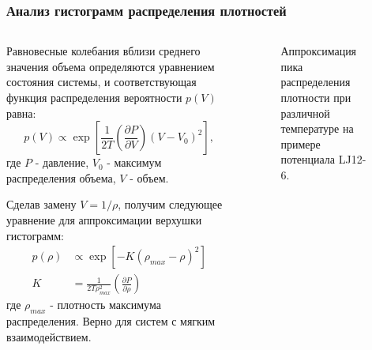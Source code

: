 \documentclass[pdf,hyperref={unicode}]{beamer}
\begin{document}
\begin{frame}
\transdissolve[duration=0.2]
\frametitle{Анализ гистограмм распределения плотностей}

\begin{columns}

\begin{column}{0.45\linewidth}
{\tiny{
Равновесные колебания вблизи среднего значения объема определяются уравнением состояния системы, и соответствующая функция распределения вероятности $p(V)$ равна:
\begin{equation}
p(V) \varpropto \exp\left[ \frac{1}{2T} \left( \frac{\partial P}{\partial V} \right)  \left(V - V_0 \right)^2 \right],
\label{eqPv}
\end{equation}
где $P$ - давление, $V_0$ - максимум распределения объема, $V$ - объем.

Сделав замену $V = 1 / \rho$, получим следующее уравнение для аппроксимации верхушки гистограмм:
\begin{equation}
\begin{aligned}
p(\rho) &\varpropto \exp \left[ - K \left(\rho_{max}- \rho \right)^2 \right] \\
K &= \frac{1}{2T\rho_{max}^2} \left( \frac{\partial P}{\partial \rho} \right)
\end{aligned}
\label{eqFitRho}
\end{equation}
где $\rho_{max}$ - плотность максимума распределения. Верно для систем с мягким взаимодействием. 
}}
\end{column}


\begin{column}{0.55\linewidth}
{
\begin{figure}[h]
\caption{\tiny Аппроксимация пика распределения плотности при различной
температуре на примере потенциала LJ12-6.}
\end{figure}
}
\end{column}


\end{columns}
\end{frame}
\end{document}
